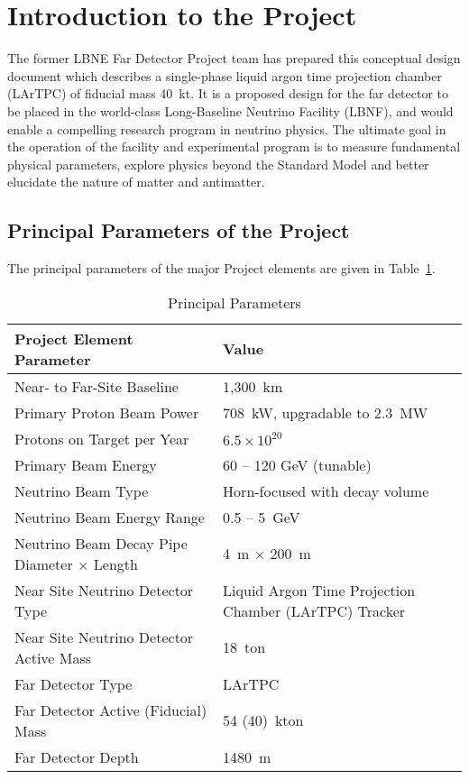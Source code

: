 

\section{Introduction to the \expshort Project}
\label{sec:intro-lbne-each-vol}

The former LBNE Far Detector Project team has prepared this conceptual design document which 
describes a single-phase liquid argon time projection chamber (LArTPC) of fiducial mass 40~kt. It is a proposed design for the far detector to be placed in
the world-class Long-Baseline Neutrino Facility (LBNF), and would enable a compelling 
research program in neutrino physics. The ultimate goal in
the operation of the facility and experimental program is to measure fundamental physical
parameters, explore physics beyond the Standard Model and better elucidate the nature of matter
and antimatter. 


\subsection{Principal Parameters of the \expshort Project}

The principal parameters of the major Project elements are given in Table~\ref{table:param-summ-fd}. 

\begin{table}[htpb]
\caption{\expshort Principal Parameters}
\label{table:param-summ-fd}
\centering
 \begin{tabular}[htbp]{|l|| p{6cm} |}
\hline
Project Element Parameter & Value  \\
\hline\hline
Near- to Far-Site Baseline &  1,300~km\\
\hline
Primary Proton Beam Power &  708~kW, upgradable to 2.3~MW\\
\hline
Protons on Target per Year &   $6.5 \times 10^{20}$  \\
\hline
Primary Beam Energy &  60 -- 120 GeV (tunable) \\
\hline
Neutrino Beam Type &  Horn-focused with decay volume\\
\hline
Neutrino Beam Energy Range &  0.5 -- 5~GeV \\ 
\hline
Neutrino Beam Decay Pipe Diameter $\times$ Length &  4~m $\times$ 200~m \\
\hline
Near Site Neutrino Detector Type & Liquid Argon Time Projection Chamber (LArTPC) Tracker \\
\hline
Near Site Neutrino Detector Active Mass &  18~ton \\
\hline
Far Detector Type &  LArTPC \\
\hline
Far Detector Active (Fiducial) Mass &  54 (40)~kton\\
\hline
Far Detector Depth &  1480~m \\
\hline
\end{tabular} 
\end{table}

